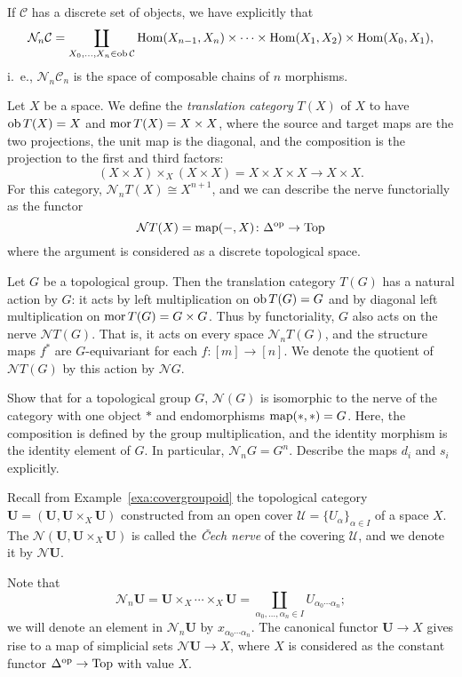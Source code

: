 \documentclass[a4paper,openany]{scrbook}
\renewcommand{\C}{\mathcal C}
\newcommand{\nerve}{\mathcal N}
\begin{document}
If $\C$ has a discrete set of objects, we have explicitly that
\[
\nerve_n\C = \coprod_{X_0,\dots,X_n \in \ob \C} \Hom(X_{n-1},X_n) \times \dots \times \Hom(X_1,X_2) \times \Hom(X_0,X_1),
\]
i.~e., $\nerve_n\C_n$ is the space of composable chains of $n$ morphisms.

\begin{example}\label{ex:translationcat}
Let $X$ be a space. We define the \emph{translation category} $T(X)$ of $X$ to have $\operatorname{ob} T(X) = X$ and $\operatorname{mor} T(X) = X \times X$, where the source and target maps are the two projections, the unit map is the diagonal, and the composition is the projection to the first and third factors:
\[
(X \times X) \times_X (X \times X) = X \times X \times X \to X \times X.
\]
For this category, $\nerve_n T(X) \cong X^{n+1}$, and we can describe the nerve functorially as the functor
\[
\nerve T(X) = \map(-,X)\colon \Delta^\op \to \Top
\]
where the argument is considered as a discrete topological space.
\end{example}

\begin{example}\label{ex:translationcatofgroup}
Let $G$ be a topological group. Then the translation category $T(G)$ has a natural action by $G$: it acts by left multiplication on $\operatorname{ob} T(G) = G$ and by diagonal left multiplication on $\operatorname{mor} T(G) = G \times G$. Thus by functoriality, $G$ also acts on the nerve $\nerve T(G)$. That is, it acts on every space $\nerve_n T(G)$, and the structure maps $f^*$ are $G$-equivariant for each $f\colon [m] \to [n]$. We denote the quotient of $\nerve T(G)$ by this action by $\nerve G$.
\end{example}

\begin{exer}
Show that for a topological group $G$, $\nerve(G)$ is isomorphic to the nerve of the category with one object $*$ and endomorphisms $\operatorname{map}(*,*)=G$. Here, the composition is defined by the group multiplication, and the identity morphism is the identity element of $G$. In particular, $\nerve_nG = G^n$. Describe the maps $d_i$ and $s_i$ explicitly.
\end{exer}

\begin{example}\label{ex:cechnerve}
Recall from Example~\ref{exa:covergroupoid} the topological category $\mathbf U = (\mathbf U,\mathbf U \times_X \mathbf U)$ constructed from an open cover $\mathcal U = \{U_\alpha\}_{\alpha \in I}$ of a space $X$. The $\nerve(\mathbf U,\mathbf U \times_X \mathbf U)$ is called the \emph{\v Cech nerve} of the covering $\mathcal U$, and we denote it by $\nerve\mathbf U$.

Note that
\[
\nerve_n\mathbf U = \mathbf U \times_X \cdots \times_X \mathbf U = \coprod_{\alpha_0,\dots,\alpha_n \in I} U_{\alpha_0\cdots\alpha_n};
\]
we will denote an element in $\nerve_n\mathbf U$ by $x_{\alpha_0\cdots\alpha_n}$. The canonical functor $\mathbf U \to X$ gives rise to a map of simplicial sets $\nerve \mathbf U \to X$, where $X$ is considered as the constant functor $\Delta^{\operatorname{op}} \to \operatorname{Top}$ with value $X$.
\end{example}
\end{document}
